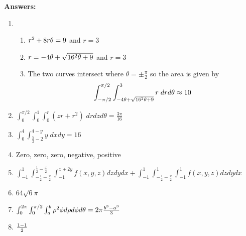 \documentclass[12pt]{article}
\let\sin\relax\DeclareMathOperator{\sin}{\mathsf{sin}}
\let\cos\relax\DeclareMathOperator{\cos}{\mathsf{cos}}
\begin{document}
{\bf Answers:}
\begin{enumerate}
\item\begin{enumerate}
\item $r^2+8r\cos{\theta}=9$ and $r=3$
\item $r=-4\cos{\theta}+\sqrt{16\cos^2{\theta}+9}$ and $r=3$
\item The two curves intersect where $\theta=\pm\frac{\pi}{2}$ so the
area is given by \[\int_{-\pi/2}^{\pi/2}\int
_{-4\cos{\theta}+\sqrt{16\cos^2{\theta}+9}}^3r\;drd\theta\approx 10\]
\end{enumerate}
\item $\int_0^{\pi/2}\int_0^1\int_0^r
\left(zr+r^2\right)\; drdzd\theta=\frac{3\pi}{16}$
\item $\int_0^4\int_{\frac{y}{2}-2}^{4-y}y\;dxdy=16$
\item Zero, zero, zero, negative, positive
\item $\int_{-1}^1\int_{-\frac{1}{2}-\frac{x}{2}}
^{\frac{1}{2}-\frac{x}{2}}\int_{-1}^{x+2y}
f\left(x,y,z\right)dzdydx
+\int_{-1}^1\int_{-\frac{1}{2}-\frac{x}{2}}
^1\int_{-1}^1
f\left(x,y,z\right)dzdydx$
\item $64\sqrt{6}\pi$
\item $\int_0^{2\pi}\int_0^{\pi/2}\int_a^b\rho^2\sin{\phi}
d\rho d\phi d\theta=2\pi\frac{b^3-a^3}{3}$
\item $\frac{1-\cos{1}}{2}$
\end{enumerate}
\end{document}

